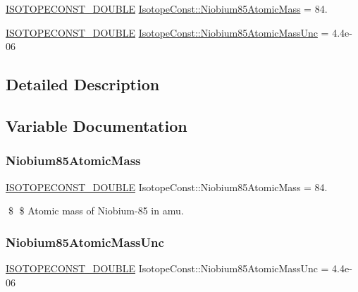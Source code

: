 \begin{DoxyCompactItemize}
\item 
\mbox{\hyperlink{group___isotope_const-_macros_ga8f45a7272ce02c0b4c65c44636ed719a}{I\+S\+O\+T\+O\+P\+E\+C\+O\+N\+S\+T\+\_\+\+D\+O\+U\+B\+LE}} \mbox{\hyperlink{group___isotope_const-_niobium-_nb85_gad0af518c7ad67dae0cbd9831bf12353c}{Isotope\+Const\+::\+Niobium85\+Atomic\+Mass}} = 84.
\item 
\mbox{\hyperlink{group___isotope_const-_macros_ga8f45a7272ce02c0b4c65c44636ed719a}{I\+S\+O\+T\+O\+P\+E\+C\+O\+N\+S\+T\+\_\+\+D\+O\+U\+B\+LE}} \mbox{\hyperlink{group___isotope_const-_niobium-_nb85_gabb0adf54691cb978ad3d0334acfd8e68}{Isotope\+Const\+::\+Niobium85\+Atomic\+Mass\+Unc}} = 4.\+4e-\/06
\end{DoxyCompactItemize}


\subsection{Detailed Description}


\subsection{Variable Documentation}
\mbox{\label{group___isotope_const-_niobium-_nb85_gad0af518c7ad67dae0cbd9831bf12353c}} 
\subsubsection{\texorpdfstring{Niobium85\+Atomic\+Mass}{Niobium85AtomicMass}}
{\footnotesize\ttfamily \mbox{\hyperlink{group___isotope_const-_macros_ga8f45a7272ce02c0b4c65c44636ed719a}{I\+S\+O\+T\+O\+P\+E\+C\+O\+N\+S\+T\+\_\+\+D\+O\+U\+B\+LE}} Isotope\+Const\+::\+Niobium85\+Atomic\+Mass = 84.}

\$ \$ Atomic mass of Niobium-\/85 in amu. \mbox{\label{group___isotope_const-_niobium-_nb85_gabb0adf54691cb978ad3d0334acfd8e68}} 
\subsubsection{\texorpdfstring{Niobium85\+Atomic\+Mass\+Unc}{Niobium85AtomicMassUnc}}
{\footnotesize\ttfamily \mbox{\hyperlink{group___isotope_const-_macros_ga8f45a7272ce02c0b4c65c44636ed719a}{I\+S\+O\+T\+O\+P\+E\+C\+O\+N\+S\+T\+\_\+\+D\+O\+U\+B\+LE}} Isotope\+Const\+::\+Niobium85\+Atomic\+Mass\+Unc = 4.\+4e-\/06}

